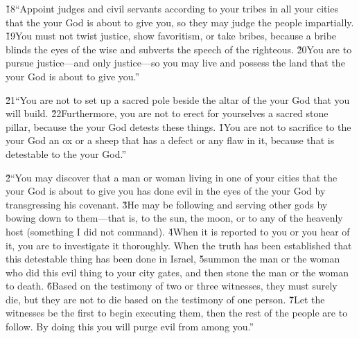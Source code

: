 \v{18}``Appoint judges and civil servants according to your tribes in all your cities that the  your God is about to give you, so they may judge the people impartially. \v{19}You must not twist justice, show favoritism, or take bribes, because a bribe blinds the eyes of the wise and subverts the speech of the righteous. \v{20}You are to pursue justice---and only justice---so you may live and possess the land that the  your God is about to give you.''

\v{21}``You are not to set up a sacred pole beside the altar of the  your God that you will build. \v{22}Furthermore, you are not to erect for yourselves a sacred stone pillar, because the  your God detests these things.
\v{1}You are not to sacrifice to the  your God an ox or a sheep that has a defect or any flaw in it, because that is detestable to the  your God.''

\v{2}``You may discover that a man or woman living in one of your cities that the  your God is about to give you has done evil in the eyes of the  your God by transgressing his covenant. \v{3}He may be following and serving other gods by bowing down to them---that is, to the sun, the moon, or to any of the heavenly host (something I did not command). \v{4}When it is reported to you or you hear of it, you are to investigate it thoroughly. When the truth has been established that this detestable thing has been done in Israel, \v{5}summon the man or the woman who did this evil thing to your city gates, and then stone the man or the woman to death. \v{6}Based on the testimony of two or three witnesses, they must surely die, but they are not to die based on the testimony of one person. \v{7}Let the witnesses be the first to begin executing them, then the rest of the people are to follow. By doing this you will purge evil from among you.''

